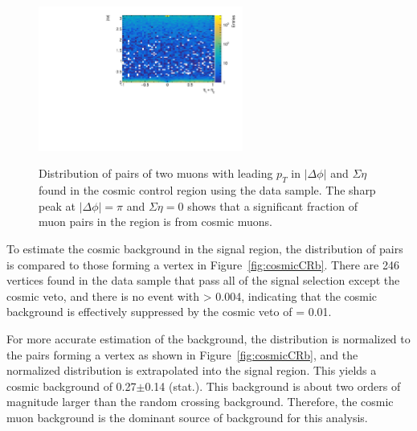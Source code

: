 \begin{figure}[!htb]
    \begin{center}
    \includegraphics[width=0.6\textwidth]{figures/Cosmics/DataValidation/mup_seta_dphi.pdf}
    \label{fig:cosmicData}
    \caption{Distribution of pairs of two muons with leading $p_{T}$ in $|\Delta \phi|$ and $\Sigma \eta$ found in the cosmic control region using the data sample. The sharp peak at $|\Delta\phi| = \pi$ and $\Sigma \eta = 0$ shows that a significant fraction of muon pairs in the region is from cosmic muons.}
\end{center}
\end{figure}

To estimate the cosmic background in the signal region, the \Rcr distribution of \mumu pairs is compared to those forming a vertex in Figure~\ref{fig:cosmicCRb}. There are 246 \mumu vertices found in the data sample that pass all of the signal selection except the cosmic veto, and there is no event with \Rcr > 0.004, indicating that the cosmic background is effectively suppressed by the cosmic veto of \Rcr = 0.01.

For more accurate estimation of the background, the \Rcr distribution is normalized to the \mumu pairs forming a vertex as shown in Figure~\ref{fig:cosmicCRb}, and the normalized distribution is extrapolated into the signal region. This yields a cosmic background of 0.27$\pm$0.14 (stat.). This background is about two orders of magnitude larger than the random crossing background. Therefore, the cosmic muon background is the dominant source of background for this analysis.


